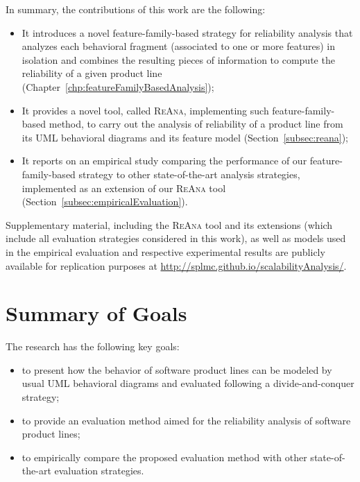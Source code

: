 In summary, the contributions of this work are the following:
\begin{itemize}
	\item It introduces a novel feature-family-based strategy for
		reliability analysis that analyzes each behavioral fragment
		(associated to one or more features) in isolation and combines
		the resulting pieces of information to compute the reliability
		of a given product line
		(Chapter~\ref{chp:featureFamilyBasedAnalysis}); 
	\item It provides a novel tool, called \textsc{ReAna}, implementing such
		feature-family-based method, to carry out the analysis of
		reliability of a product line from its UML behavioral diagrams
		and its feature model (Section~\ref{subsec:reana});
	\item It reports on an empirical study comparing the performance of our
		feature-family-based strategy to other state-of-the-art analysis
		strategies, implemented as an extension of our \textsc{ReAna}
		tool (Section~\ref{subsec:empiricalEvaluation}).   
\end{itemize}

Supplementary material, including the \textsc{ReAna} tool and its extensions
(which include all evaluation strategies considered in this work), as well as
models used in the empirical evaluation and respective experimental results are
publicly available for replication purposes at
\url{http://splmc.github.io/scalabilityAnalysis/}. 


\section{Summary of Goals \label{sec:summaryOfGoals}}

The research has the following key goals:

\begin{itemize}
	\item to present how the behavior of software product lines can be modeled by usual UML behavioral diagrams and evaluated following a divide-and-conquer strategy;
	\item to provide an evaluation method aimed for the reliability analysis of software product lines; 
	\item to empirically compare the proposed evaluation method with other state-of-the-art evaluation strategies.
\end{itemize}











